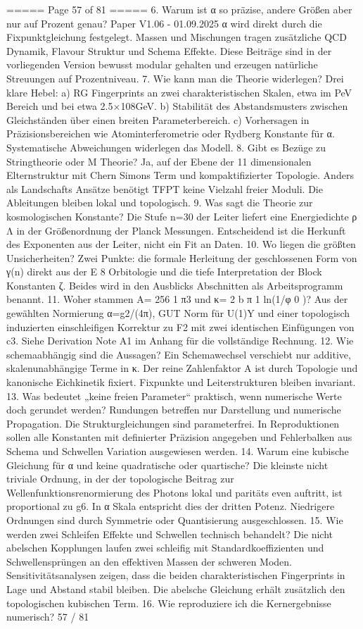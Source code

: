 \begin{MyVerbatim}
{{===== Page 57 of 81 =====
6. Warum ist α so präzise, andere Größen aber nur auf Prozent genau?
Paper V1.06 - 01.09.2025
α wird direkt durch die Fixpunktgleichung festgelegt. Massen und Mischungen tragen zusätzliche QCD Dynamik, Flavour
Struktur und Schema Effekte. Diese Beiträge sind in der vorliegenden Version bewusst modular gehalten und erzeugen
natürliche Streuungen auf Prozentniveau.
7. Wie kann man die Theorie widerlegen?
Drei klare Hebel:
a) RG Fingerprints an zwei charakteristischen Skalen, etwa im PeV Bereich und bei etwa 2.5×108GeV.
b) Stabilität des Abstandsmusters zwischen Gleichständen über einen breiten Parameterbereich.
c) Vorhersagen in Präzisionsbereichen wie Atominterferometrie oder Rydberg Konstante für α. Systematische
Abweichungen widerlegen das Modell.
8. Gibt es Bezüge zu Stringtheorie oder M Theorie?
Ja, auf der Ebene der 11 dimensionalen Elternstruktur mit Chern Simons Term und kompaktifizierter Topologie. Anders
als Landschafts Ansätze benötigt TFPT keine Vielzahl freier Moduli. Die Ableitungen bleiben lokal und topologisch.
9. Was sagt die Theorie zur kosmologischen Konstante?
Die Stufe n=30 der Leiter liefert eine Energiedichte ρ Λ in der Größenordnung der Planck Messungen. Entscheidend ist
die Herkunft des Exponenten aus der Leiter, nicht ein Fit an Daten.
10. Wo liegen die größten Unsicherheiten?
Zwei Punkte: die formale Herleitung der geschlossenen Form von γ(n) direkt aus der E 8 Orbitologie und die tiefe
Interpretation der Block Konstanten ζ. Beides wird in den Ausblicks Abschnitten als Arbeitsprogramm benannt.
11. Woher stammen A= 256 1 π3 und κ= 2 b π 1 ln(1/φ 0 )?
Aus der gewählten Normierung α=g2/(4π), GUT Norm für U(1){Y} und einer topologisch induzierten einschleifigen
Korrektur zu F2 mit zwei identischen Einfügungen von c3. Siehe Derivation Note A1 im Anhang für die vollständige
Rechnung.
12. Wie schemaabhängig sind die Aussagen?
Ein Schemawechsel verschiebt nur additive, skalenunabhängige Terme in κ. Der reine Zahlenfaktor A ist durch Topologie
und kanonische Eichkinetik fixiert. Fixpunkte und Leiterstrukturen bleiben invariant.
13. Was bedeutet „keine freien Parameter“ praktisch, wenn numerische Werte doch gerundet werden?
Rundungen betreffen nur Darstellung und numerische Propagation. Die Strukturgleichungen sind parameterfrei. In
Reproduktionen sollen alle Konstanten mit definierter Präzision angegeben und Fehlerbalken aus Schema und
Schwellen Variation ausgewiesen werden.
14. Warum eine kubische Gleichung für α und keine quadratische oder quartische?
Die kleinste nicht triviale Ordnung, in der der topologische Beitrag zur Wellenfunktionsrenormierung des Photons lokal
und paritäts even auftritt, ist proportional zu g6. In α Skala entspricht dies der dritten Potenz. Niedrigere Ordnungen sind
durch Symmetrie oder Quantisierung ausgeschlossen.
15. Wie werden zwei Schleifen Effekte und Schwellen technisch behandelt?
Die nicht abelschen Kopplungen laufen zwei schleifig mit Standardkoeffizienten und Schwellensprüngen an den
effektiven Massen der schweren Moden. Sensitivitätsanalysen zeigen, dass die beiden charakteristischen Fingerprints in
Lage und Abstand stabil bleiben. Die abelsche Gleichung erhält zusätzlich den topologischen kubischen Term.
16. Wie reproduziere ich die Kernergebnisse numerisch?
57 / 81

}}
\end{MyVerbatim}
